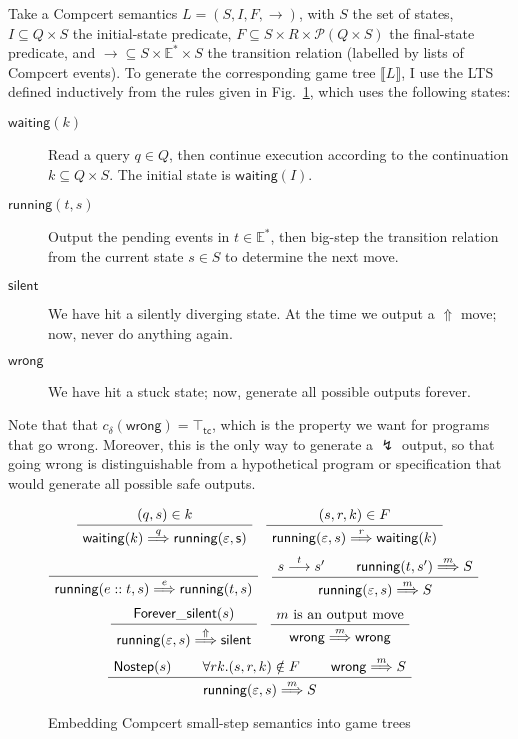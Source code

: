 \documentclass{article}
\newcommand{\kw}[1]{{\mathsf{#1}}}
\begin{document}
Take a Compcert semantics $L = (S, I, F, \rightarrow)$,
with $S$ the set of states,
$I \subseteq Q \times S$
the initial-state predicate,
$F \subseteq S \times R \times \mathcal{P}(Q \times S)$
the final-state predicate, and
${\rightarrow} \subseteq S \times \mathbb{E}^* \times S$
the transition relation (labelled by lists of Compcert events).
To generate the corresponding game tree $\llbracket L \rrbracket$,
I use the LTS defined inductively
from the rules given in Fig.~\ref{fig:embed},
which uses the following states:
\begin{description}
\item[$\kw{waiting}(k)$]
  Read a query $q \in Q$,
  then continue execution according to the continuation
  $k \subseteq Q \times S$.
  The initial state is $\kw{waiting}(I)$.
\item[$\kw{running}(t, s)$]
  Output the pending events in $t \in \mathbb{E}^*$,
  then big-step the transition relation from the current state $s \in S$
  to determine the next move.
\item[$\kw{silent}$]
  We have hit a silently diverging state.
  At the time we output a $\Uparrow$ move;
  now, never do anything again.
\item[$\kw{wrong}$]
  We have hit a stuck state;
  now, generate all possible outputs forever.
\end{description}
Note that that $c_\delta(\kw{wrong}) = \top_\kw{tc}$,
which is the property we want for programs that go wrong.
Moreover, this is the only way to generate a $\lightning$ output,
so that going wrong is distinguishable from
a hypothetical program or specification that would
generate all possible safe outputs.

\begin{figure}
\[
  \AxiomC{$(q, s) \in k$}
  \UnaryInfC{$\kw{waiting}(k) \stackrel{q}{\Longrightarrow} \kw{running(\varepsilon, s)}$}
  \DisplayProof
  \quad
  \AxiomC{$(s, r, k) \in F$}
  \UnaryInfC{$\kw{running}(\varepsilon, s) \stackrel{r}{\Longrightarrow} \kw{waiting}(k)$}
  \DisplayProof
\]
\vspace{.5em}
\[
  \AxiomC{\rule[-.3\baselineskip]{0pt}{\baselineskip}}
  \UnaryInfC{$\kw{running}(e::t, s) \stackrel{e}{\Longrightarrow} \kw{running}(t, s)$}
  \DisplayProof
  \quad
  \AxiomC{$s \stackrel{t}{\longrightarrow} s'$}
  \AxiomC{$\kw{running}(t, s') \stackrel{m}{\Longrightarrow} S$}
  \BinaryInfC{$\kw{running}(\varepsilon, s) \stackrel{m}{\Longrightarrow} S$}
  \DisplayProof
\]
\vspace{.5em}
\[
  \AxiomC{$\kw{Forever\_silent}(s)$}
  \UnaryInfC{$\kw{running}(\varepsilon, s) \stackrel{\Uparrow}{\Longrightarrow} \kw{silent}$}
  \DisplayProof
  \quad
  \AxiomC{$m \mbox{ is an output move}$}
  \UnaryInfC{$\kw{wrong} \stackrel{m}{\Longrightarrow} \kw{wrong}$}
  \DisplayProof
\]
\vspace{.5em}
\[
  \AxiomC{$\kw{Nostep}(s)$}
  \AxiomC{$\forall r k . (s, r, k) \notin F$}
  \AxiomC{$\kw{wrong} \stackrel{m}{\Longrightarrow} S$}
  \TrinaryInfC{$\kw{running}(\varepsilon, s) \stackrel{m}{\Longrightarrow} S$}
  \DisplayProof
\]
\caption{Embedding Compcert small-step semantics into game trees}
\label{fig:embed}
\end{figure}
\end{document}
